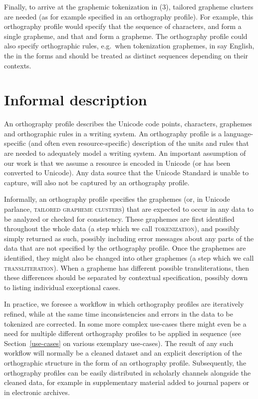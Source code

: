 Finally, to arrive at the graphemic tokenization in
(3), tailored grapheme clusters are needed (as for example specified in an
orthography profile). For example, this orthography profile would specify that
the sequence of characters, and form a single grapheme, and that and form a
grapheme. The orthography profile could also specify orthographic rules,
e.g.~when tokenization graphemes, in say English, the in the forms and should be
treated as distinct sequences depending on their contexts.

\section{Informal description}
\label{informal-description-of-orthography-profiles}

An orthography profile describes the Unicode code points, characters, graphemes
and orthographic rules in a writing system. An orthography profile is a
language-specific (and often even resource-specific) description of the units
and rules that are needed to adequately model a writing system. An important
assumption of our work is that we assume a resource is encoded in Unicode (or
has been converted to Unicode). Any data source that the Unicode Standard is
unable to capture, will also not be captured by an orthography profile.

Informally, an orthography profile specifies the graphemes (or, in Unicode
parlance, \textsc{tailored grapheme clusters}) that are expected to occur in any
data to be analyzed or checked for consistency. These graphemes are first
identified throughout the whole data (a step which we call
\textsc{tokenization}), and possibly simply returned as such, possibly including
error messages about any parts of the data that are not specified by the
orthography profile. Once the graphemes are identified, they might also be
changed into other graphemes (a step which we call \textsc{transliteration}).
When a grapheme has different possible transliterations, then these differences
should be separated by contextual specification, possibly down to listing
individual exceptional cases.

In practice, we foresee a workflow in which orthography profiles are iteratively
refined, while at the same time inconsistencies and errors in the data to be
tokenized are corrected. In some more complex use-cases there might even be a
need for multiple different orthography profiles to be applied in sequence (see
Section~\ref{use-cases} on various exemplary use-cases). The result of any such
workflow will normally be a cleaned dataset and an explicit description of the
orthographic structure in the form of an orthography profile. Subsequently, the
orthography profiles can be easily distributed in scholarly channels alongside
the cleaned data, for example in supplementary material added to journal papers
or in electronic archives.

